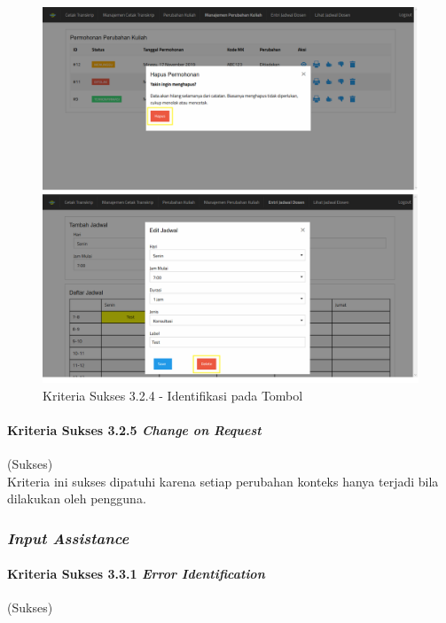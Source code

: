 \documentclass[a4paper,twoside]{article}
\begin{document}
\begin{enumerate}
		\begin{figure}[H]
			\centering  
			\includegraphics[scale=0.3, frame]{kriteria-sukses-3-2-4-consistent-identification}  
			\caption[Kriteria Sukses 3.2.4 - Identifikasi pada Tombol]{Kriteria Sukses 3.2.4 - Identifikasi pada Tombol}
			\label{fig:3.2.4_consistent_identification}  
		\end{figure}

		\paragraph{Kriteria Sukses 3.2.5 \textit{Change on Request}}
		\label{par:kepatuhan_bluetape_kriteria_sukses_3.2.5}
		(Sukses)\\

		Kriteria ini sukses dipatuhi karena setiap perubahan konteks hanya terjadi bila dilakukan oleh pengguna.

		\subsubsection*{\textit{Input Assistance}}
		\label{subsubsec:kepatuhan_bluetape_input_assistance}

		\paragraph{Kriteria Sukses 3.3.1 \textit{Error Identification}}
		\label{par:kepatuhan_bluetape_kriteria_sukses_3.3.1}
		(Sukses)\\


\end{enumerate}
\end{document}
